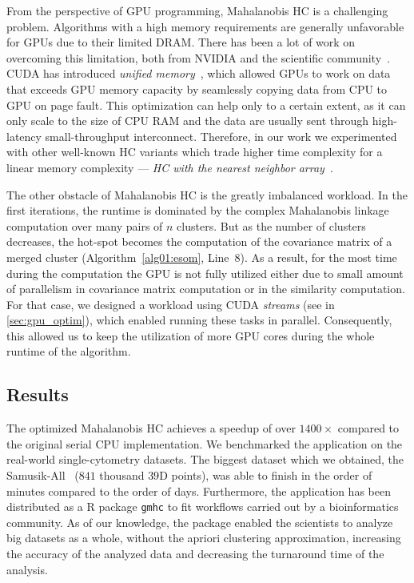 From the perspective of GPU programming, Mahalanobis HC is a challenging problem. Algorithms with a high memory requirements are generally unfavorable for GPUs due to their limited DRAM. There has been a lot of work on overcoming this limitation, both from NVIDIA and the scientific community~\cite{zheng2016towards,kim2020batch,landaverde2014investigation}. CUDA has introduced \emph{unified memory}~\cite{site:cuda}, which allowed GPUs to work on data that exceeds GPU memory capacity by seamlessly copying data from CPU to GPU on page fault. This optimization can help only to a certain extent, as it can only scale to the size of CPU RAM and the data are usually sent through high-latency small-throughput interconnect. Therefore, in our work we experimented with other well-known HC variants which trade higher time complexity for a linear memory complexity --- \emph{HC with the nearest neighbor array}~\cite{day1984efficient}.


The other obstacle of Mahalanobis HC is the greatly imbalanced workload. In the first iterations, the runtime is dominated by the complex Mahalanobis linkage computation over many pairs of $n$ clusters. But as the number of clusters decreases, the hot-spot becomes the computation of the covariance matrix of a merged cluster (Algorithm~\ref{alg01:esom}, Line~8). As a result, for the most time during the computation the GPU is not fully utilized either due to small amount of parallelism in covariance matrix computation or in the similarity computation. For that case, we designed a workload using CUDA \emph{streams} (see  in \cref{sec:gpu_optim}), which enabled running these tasks in parallel. Consequently, this allowed us to keep the utilization of more GPU cores during the whole runtime of the algorithm.

\subsection{Results}

The optimized Mahalanobis HC achieves a speedup of over $1400\times$ compared to the original serial CPU implementation. We benchmarked the application on the real-world single-cytometry datasets. The biggest dataset which we obtained, the Samusik-All~\cite{flowrepo} ($841$ thousand $39$D points), was able to finish in the order of minutes compared to the order of days. Furthermore, the application has been distributed as a R package \texttt{gmhc} to fit workflows carried out by a bioinformatics community. As of our knowledge, the package enabled the scientists to analyze big datasets as a whole, without the apriori clustering approximation, increasing the accuracy of the analyzed data and decreasing the turnaround time of the analysis.

